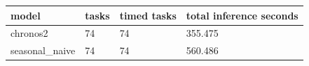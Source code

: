 \begin{tabular}{llll}
\toprule
model & tasks & timed tasks & total inference seconds \\
\midrule
chronos2 & 74 & 74 & 355.475 \\
seasonal\_naive & 74 & 74 & 560.486 \\
\bottomrule
\end{tabular}

